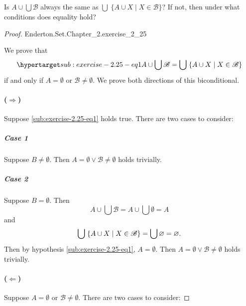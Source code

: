 \documentclass{report}
\begin{document}
\subsection{}%

Is $A \cup \bigcup \mathscr{B}$ always the same as
  $\bigcup\;\{ A \cup X \mid X \in \mathscr{B} \}$?
If not, then under what conditions does equality hold?

\begin{proof}

    {Enderton.Set.Chapter\_2.exercise\_2\_25}

  We prove that
    \begin{equation}
      \hyperlabel{sub:exercise-2.25-eq1}
      A \cup \bigcup \mathscr{B} =
        \bigcup\;\{ A \cup X \mid X \in \mathscr{B} \}
    \end{equation}
    if and only if $A = \emptyset$ or $\mathscr{B} \neq \emptyset$.
  We prove both directions of this biconditional.

  \paragraph{($\Rightarrow$)}%

    Suppose \eqref{sub:exercise-2.25-eq1} holds true.
    There are two cases to consider:

    \subparagraph{Case 1}%

      Suppose $B \neq \emptyset$.
      Then $A = \emptyset \lor \mathscr{B} \neq \emptyset$ holds trivially.

    \subparagraph{Case 2}%

      Suppose $B = \emptyset$.
      Then $$A \cup \bigcup \mathscr{B} = A \cup \bigcup \emptyset = A$$ and
        $$
          \bigcup\;\{ A \cup X \mid X \in \mathscr{B} \}
            = \bigcup \emptyset \\
            = \emptyset.
        $$
      Then by hypothesis \eqref{sub:exercise-2.25-eq1}, $A = \emptyset$.
      Then $A = \emptyset \lor \mathscr{B} \neq \emptyset$ holds trivially.

  \paragraph{($\Leftarrow$)}%

    Suppose $A = \emptyset$ or $\mathscr{B} \neq \emptyset$.
    There are two cases to consider:


\end{proof}
\end{document}
